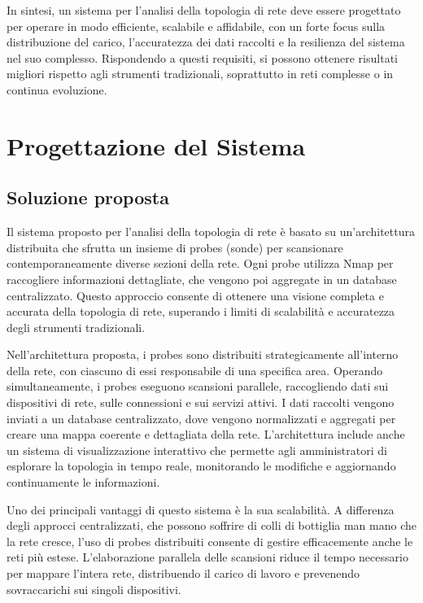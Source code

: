 \documentclass[target=bach,aauheader=,style=]{thud}
\begin{document}
In sintesi, un sistema per l'analisi della topologia di rete deve essere progettato per operare in modo efficiente, scalabile e affidabile, con un forte focus sulla distribuzione del carico, l'accuratezza dei dati raccolti e la resilienza del sistema nel suo complesso. Rispondendo a questi requisiti, si possono ottenere risultati migliori rispetto agli strumenti tradizionali, soprattutto in reti complesse o in continua evoluzione.

\chapter{Progettazione del Sistema}

\section{Soluzione proposta}
Il sistema proposto per l'analisi della topologia di rete è basato su un'architettura distribuita che sfrutta un insieme di probes (sonde) per scansionare contemporaneamente diverse sezioni della rete. Ogni probe utilizza Nmap per raccogliere informazioni dettagliate, che vengono poi aggregate in un database centralizzato. Questo approccio consente di ottenere una visione completa e accurata della topologia di rete, superando i limiti di scalabilità e accuratezza degli strumenti tradizionali.

Nell'architettura proposta, i probes sono distribuiti strategicamente all'interno della rete, con ciascuno di essi responsabile di una specifica area. Operando simultaneamente, i probes eseguono scansioni parallele, raccogliendo dati sui dispositivi di rete, sulle connessioni e sui servizi attivi. I dati raccolti vengono inviati a un database centralizzato, dove vengono normalizzati e aggregati per creare una mappa coerente e dettagliata della rete. L'architettura include anche un sistema di visualizzazione interattivo che permette agli amministratori di esplorare la topologia in tempo reale, monitorando le modifiche e aggiornando continuamente le informazioni.

Uno dei principali vantaggi di questo sistema è la sua scalabilità. A differenza degli approcci centralizzati, che possono soffrire di colli di bottiglia man mano che la rete cresce, l'uso di probes distribuiti consente di gestire efficacemente anche le reti più estese. L'elaborazione parallela delle scansioni riduce il tempo necessario per mappare l'intera rete, distribuendo il carico di lavoro e prevenendo sovraccarichi sui singoli dispositivi.
\end{document}
